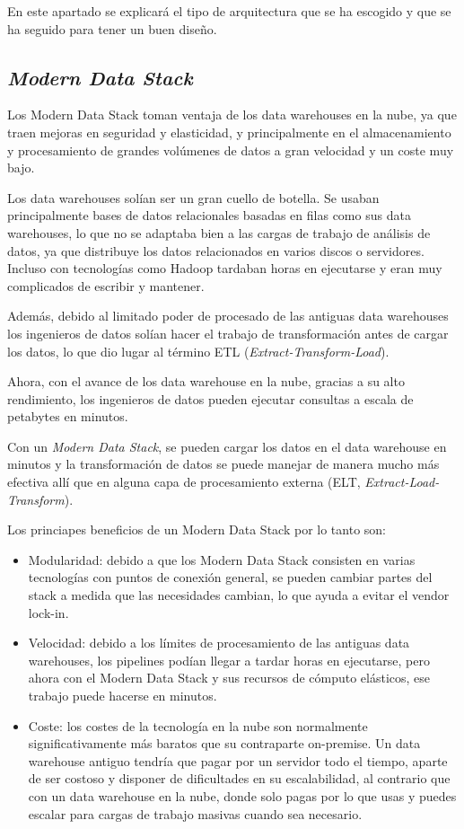 En este apartado se explicará el tipo de arquitectura que se ha escogido y que se ha seguido para tener un buen diseño.

\subsection{\emph{Modern Data Stack}}
Los Modern Data Stack \cite{Modern_Data_Stack} toman ventaja de los data warehouses en la nube, ya que traen mejoras en seguridad y elasticidad, y principalmente en el almacenamiento y procesamiento de grandes volúmenes de datos a gran velocidad y un coste muy bajo.

Los data warehouses solían ser un gran cuello de botella. Se usaban principalmente bases de datos relacionales basadas en filas como sus data warehouses, lo que no se adaptaba bien a las cargas de trabajo de análisis de datos, ya que distribuye los datos relacionados en varios discos o servidores. Incluso con tecnologías como Hadoop tardaban horas en ejecutarse y eran muy complicados de escribir y mantener. 

Además, debido al limitado poder de procesado de las antiguas data warehouses los ingenieros de datos solían hacer el trabajo de transformación antes de cargar los datos, lo que dio lugar al término ETL (\emph{Extract-Transform-Load}).

Ahora, con el avance de los data warehouse en la nube, gracias a su alto rendimiento, los ingenieros de datos pueden ejecutar consultas a escala de petabytes en minutos. 

Con un \emph{Modern Data Stack}, se pueden cargar los datos en el data warehouse en minutos y la transformación de datos se puede manejar de manera mucho más efectiva allí que en alguna capa de procesamiento externa (ELT, \emph{Extract-Load-Transform}).

Los princiapes beneficios de un Modern Data Stack por lo tanto son:

\begin{itemize}
	\item Modularidad: debido a que los Modern Data Stack consisten en varias tecnologías con puntos de conexión general, se pueden cambiar partes del stack a medida que las necesidades cambian, lo que ayuda a evitar el vendor lock-in.
	\item Velocidad: debido a los límites de procesamiento de las antiguas data warehouses, los pipelines podían llegar a tardar horas en ejecutarse, pero ahora con el Modern Data Stack y sus recursos de cómputo elásticos, ese trabajo puede hacerse en minutos.
	\item Coste: los costes de la tecnología en la nube son normalmente significativamente más baratos que su contraparte on-premise. Un data warehouse antiguo tendría que pagar por un servidor todo el tiempo, aparte de ser costoso y disponer de dificultades en su escalabilidad, al contrario que con un data warehouse en la nube, donde solo pagas por lo que usas y puedes escalar para cargas de trabajo masivas cuando sea necesario.
\end{itemize}

